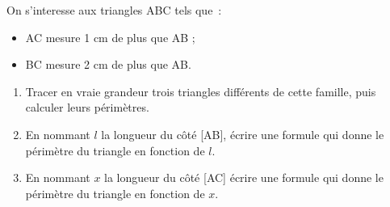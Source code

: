 \documentclass[exercice]{thedocument}%
\begin{document}
%
On s'interesse aux triangles ABC tels que~:
\begin{itemize}
    \item AC mesure 1 cm de plus que AB ;
    \item BC mesure 2 cm de plus que AB.
\end{itemize}
\begin{enumerate}
    \item Tracer en vraie grandeur trois triangles différents de cette famille,
    puis calculer leurs périmètres.
    \item En nommant $l$ la longueur du côté [AB], écrire une formule qui
    donne le périmètre du triangle en fonction de $l$.
    \item En nommant $x$ la longueur du côté [AC] écrire une formule qui donne
    le périmètre du triangle en fonction de $x$.
\end{enumerate}
\end{document}
